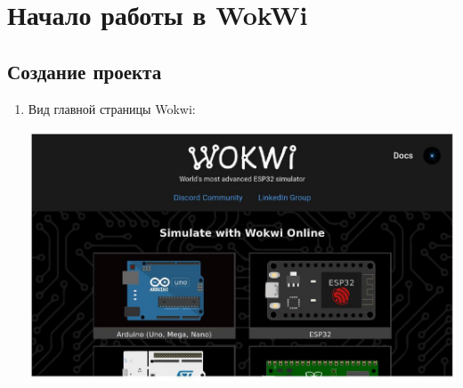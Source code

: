 \graphicspath{{intro/images}}

\newcommand{\maxwidth}{\textwidth}
\newcommand{\maxheight}{0.44\textheight}
\newcommand{\maxlessheight}{0.35\textheight}

\section{Начало работы в WokWi}

\subsection{Создание проекта}

\begin{enumerate}

    \item Вид главной страницы Wokwi:
    
    \includegraphics[max width=\maxwidth, max height=\maxlessheight, center]{1.jpg}    
    

\end{enumerate}
